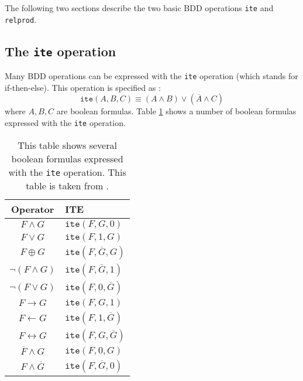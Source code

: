 The following two sections describe the two basic BDD operations \texttt{ite} and \texttt{relprod}.

\subsection{The \texttt{ite} operation}
Many BDD operations can be expressed with the \texttt{ite} operation (which stands for if-then-else). This operation is specified as \cite{dijk2012parallelization}:
\begin{equation}
	\texttt{ite}(A, B, C) \equiv (A \wedge B) \vee (\overline A \wedge C)
\end{equation}
where $A, B, C$ are boolean formulas. Table \ref{tab:ite} shows a number of boolean formulas expressed with the \texttt{ite} operation.

\begin{table}[ht]
	\centering
	\begin{tabular}{| c | l |}
		\hline
		Operator & ITE \\ 
		\hline 
		$F \wedge G$ & $\texttt{ite}(F, G, 0)$ \\
		$F \vee G$ & $\texttt{ite}(F, 1, G)$ \\
		$F \oplus G$ & $\texttt{ite}(F, \overline G, G)$ \\
		$\neg (F \wedge G)$ & $\texttt{ite}(F, \overline G, 1)$ \\
		$\neg (F \vee G)$ & $\texttt{ite}(F, 0, \overline G)$ \\
		$F \rightarrow G$ & $\texttt{ite}(F, G, 1)$ \\
		$F \leftarrow G$ & $\texttt{ite}(F, 1, \overline G)$ \\
		$F \leftrightarrow G$ & $\texttt{ite}(F, G, \overline G)$ \\
		$\overline F \wedge G$ & $\texttt{ite}(F, 0, G)$ \\
		$F \wedge \overline G$ & $\texttt{ite}(F, \overline G, 0)$ \\
		\hline
	\end{tabular}
	\caption{This table shows several boolean formulas expressed with the \texttt{ite} operation. This table is taken from \cite{dijk2012parallelization}.}
	\label{tab:ite}
\end{table}

